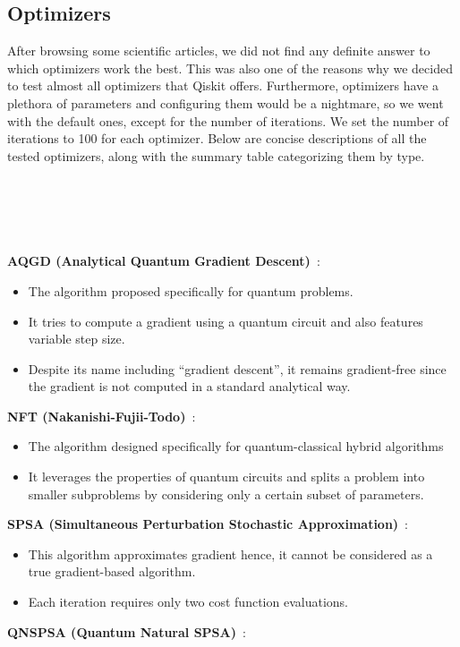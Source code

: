 \tocless\subsection{Optimizers}\noindent
After browsing some scientific articles, we did not find any definite answer to which optimizers work the best. This was also one of the reasons why we decided to test almost all optimizers that Qiskit offers. Furthermore, optimizers have a plethora of parameters and configuring them would be a nightmare, so we went with the default ones, except for the number of iterations. We set the number of iterations to 100 for each optimizer. Below are concise descriptions of all the tested optimizers, along with the summary table categorizing them by type.\\\\\\\\\\\\
\textbf{AQGD (Analytical Quantum Gradient Descent)}~\cite{aqgd}:
\begin{itemize}
    \item The algorithm proposed specifically for quantum problems.
    \item It tries to compute a gradient using a quantum circuit and also features variable step size.
    \item Despite its name including ``gradient descent'', it remains gradient-free since the gradient is not computed in a standard analytical way.
\end{itemize}
\textbf{NFT (Nakanishi-Fujii-Todo)}~\cite{nft}:
\begin{itemize}
    \item The algorithm designed specifically for quantum-classical hybrid algorithms
    \item It leverages the properties of quantum circuits and splits a problem into smaller subproblems by considering only a certain subset of parameters.
\end{itemize}
\textbf{SPSA (Simultaneous Perturbation Stochastic Approximation)}~\cite{spsa}:
\begin{itemize}
    \item This algorithm approximates gradient hence, it cannot be considered as a true gradient-based algorithm.
    \item Each iteration requires only two cost function evaluations.
\end{itemize}
\textbf{QNSPSA (Quantum Natural SPSA)}~\cite{qnspsa}:
